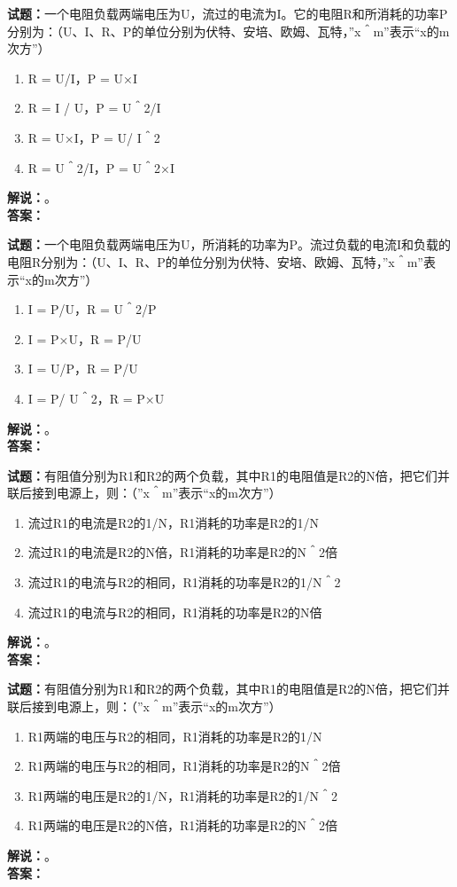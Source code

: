 \documentclass{ctexbook}
\begin{document}
\bigskip

\noindent\textbf{试题：}一个电阻负载两端电压为U，流过的电流为I。它的电阻R和所消耗的功率P分别为：（U、I、R、P的单位分别为伏特、安培、欧姆、瓦特，”x＾m”表示“x的m次方”）
\begin{enumerate}[leftmargin=3em]
  \item R = U/I，P = U×I
  \item R = I / U，P = U＾2/I
  \item R = U×I，P = U/ I＾2
  \item R = U＾2/I，P = U＾2×I
\end{enumerate}
\noindent\textbf{解说：}\textbf{}。\\\noindent\textbf{答案：}

\bigskip

\noindent\textbf{试题：}一个电阻负载两端电压为U，所消耗的功率为P。流过负载的电流I和负载的电阻R分别为：（U、I、R、P的单位分别为伏特、安培、欧姆、瓦特，”x＾m”表示“x的m次方”）
\begin{enumerate}[leftmargin=3em]
  \item I = P/U，R = U＾2/P
  \item I = P×U，R = P/U
  \item I = U/P，R = P/U
  \item I = P/ U＾2，R = P×U
\end{enumerate}
\noindent\textbf{解说：}\textbf{}。\\\noindent\textbf{答案：}

\bigskip

\noindent\textbf{试题：}有阻值分别为R1和R2的两个负载，其中R1的电阻值是R2的N倍，把它们并联后接到电源上，则：（”x＾m”表示“x的m次方”）
\begin{enumerate}[leftmargin=3em]
  \item 流过R1的电流是R2的1/N，R1消耗的功率是R2的1/N
  \item 流过R1的电流是R2的N倍，R1消耗的功率是R2的N＾2倍
  \item 流过R1的电流与R2的相同，R1消耗的功率是R2的1/N＾2
  \item 流过R1的电流与R2的相同，R1消耗的功率是R2的N倍
\end{enumerate}
\noindent\textbf{解说：}\textbf{}。\\\noindent\textbf{答案：}

\bigskip

\noindent\textbf{试题：}有阻值分别为R1和R2的两个负载，其中R1的电阻值是R2的N倍，把它们并联后接到电源上，则：（”x＾m”表示“x的m次方”）
\begin{enumerate}[leftmargin=3em]
  \item R1两端的电压与R2的相同，R1消耗的功率是R2的1/N
  \item R1两端的电压与R2的相同，R1消耗的功率是R2的N＾2倍
  \item R1两端的电压是R2的1/N，R1消耗的功率是R2的1/N＾2
  \item R1两端的电压是R2的N倍，R1消耗的功率是R2的N＾2倍
\end{enumerate}
\noindent\textbf{解说：}\textbf{}。\\\noindent\textbf{答案：}
\end{document}
